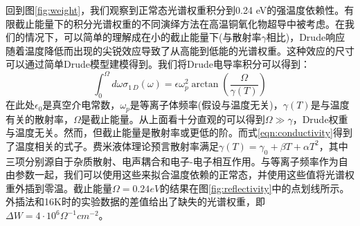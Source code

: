 \documentclass[reprint, aps, prb, showkeys]{revtex4-2}
\begin{document}
回到图\ref{fig:weight}，我们观察到正常态光谱权重积分到0.24 eV的强温度依赖性。有限截止能量下的积分光谱权重的不同演绎方法在高温铜氧化物超导中被考虑。在我们的情况下，可以简单的理解成在小的截止能量下(与散射率$\gamma$相比)，Drude响应随着温度降低而出现的尖锐效应导致了从高能到低能的光谱权重。这种效应的尺寸可以通过简单Drude模型建模得到。我们将Drude电导率积分可以得到：
\begin{equation}
    \int_0^{\Omega} d \omega \sigma_{1 \, D}(\omega) = \epsilon \omega_p^2 \arctan( \frac{\Omega}{\gamma(T)} ) \label{eqn:conductivity}
\end{equation}
在此处$\epsilon_0$是真空介电常数，$\omega_p$是等离子体频率(假设与温度无关)，$\gamma(T)$是与温度有关的散射率，$\Omega$是截止能量。从上面看十分直观的可以得到$\Omega \gg \gamma$，Drude权重与温度无关。然而，但截止能量是散射率或更低的阶。而式\ref{eqn:conductivity}得到了温度相关的式子。费米液体理论预言散射率满足$\gamma(T) = \gamma_0 + \beta T + \alpha T^2$，其中三项分别源自于杂质散射、电声耦合和电子-电子相互作用。与等离子频率作为自由参数一起，我们可以使用这些来拟合温度依赖的正常态，并使用这些值将光谱权重外插到零温。截止能量$\Omega = 0.24 eV$的结果在图\ref{fig:reflectivity}中的点划线所示。外插法和16K时的实验数据的差值给出了缺失的光谱权重，即$\Delta W = 4 \cdot 10^6 \Omega^{-1} cm^{-2}$。
\end{document}
